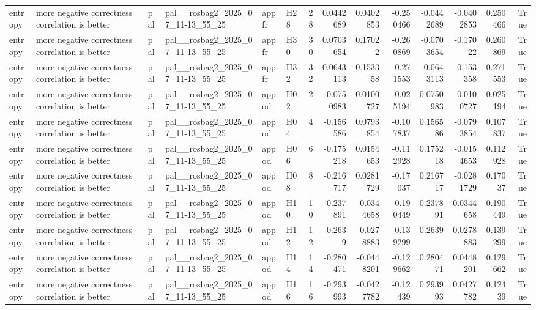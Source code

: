 \begin{longtable}{llllllrrrrrrrr}
entropy & more negative correctness correlation is better & pal & pal\_\_rosbag2\_2025\_07\_11-13\_55\_25 & appfr & H28 & 28 & 0.0442689 & 0.0402853 & -0.250466 & -0.0442689 & -0.0402853 & 0.250466 & True \\
entropy & more negative correctness correlation is better & pal & pal\_\_rosbag2\_2025\_07\_11-13\_55\_25 & appfr & H30 & 30 & 0.0703654 & 0.17022 & -0.260869 & -0.0703654 & -0.17022 & 0.260869 & True \\
entropy & more negative correctness correlation is better & pal & pal\_\_rosbag2\_2025\_07\_11-13\_55\_25 & appfr & H32 & 32 & 0.0643113 & 0.153358 & -0.271553 & -0.0643113 & -0.153358 & 0.271553 & True \\
entropy & more negative correctness correlation is better & pal & pal\_\_rosbag2\_2025\_07\_11-13\_55\_25 & appod & H02 & 2 & -0.0750983 & 0.0100727 & -0.025194 & 0.0750983 & -0.0100727 & 0.025194 & True \\
entropy & more negative correctness correlation is better & pal & pal\_\_rosbag2\_2025\_07\_11-13\_55\_25 & appod & H04 & 4 & -0.156586 & 0.0793854 & -0.107837 & 0.156586 & -0.0793854 & 0.107837 & True \\
entropy & more negative correctness correlation is better & pal & pal\_\_rosbag2\_2025\_07\_11-13\_55\_25 & appod & H06 & 6 & -0.175218 & 0.0154653 & -0.112928 & 0.175218 & -0.0154653 & 0.112928 & True \\
entropy & more negative correctness correlation is better & pal & pal\_\_rosbag2\_2025\_07\_11-13\_55\_25 & appod & H08 & 8 & -0.216717 & 0.0281729 & -0.17037 & 0.216717 & -0.0281729 & 0.17037 & True \\
entropy & more negative correctness correlation is better & pal & pal\_\_rosbag2\_2025\_07\_11-13\_55\_25 & appod & H10 & 10 & -0.237891 & -0.0344658 & -0.190449 & 0.237891 & 0.0344658 & 0.190449 & True \\
entropy & more negative correctness correlation is better & pal & pal\_\_rosbag2\_2025\_07\_11-13\_55\_25 & appod & H12 & 12 & -0.2639 & -0.0278883 & -0.139299 & 0.2639 & 0.0278883 & 0.139299 & True \\
entropy & more negative correctness correlation is better & pal & pal\_\_rosbag2\_2025\_07\_11-13\_55\_25 & appod & H14 & 14 & -0.280471 & -0.0448201 & -0.129662 & 0.280471 & 0.0448201 & 0.129662 & True \\
entropy & more negative correctness correlation is better & pal & pal\_\_rosbag2\_2025\_07\_11-13\_55\_25 & appod & H16 & 16 & -0.293993 & -0.0427782 & -0.12439 & 0.293993 & 0.0427782 & 0.12439 & True \\

\end{longtable}

